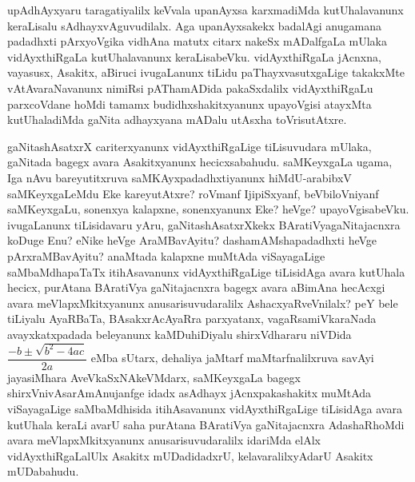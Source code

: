 upAdhAyxyaru taragatiyalilx keVvala upanAyxsa karxmadiMda kutUhalavanunx keraLi\-salu sAdhayxvAguvudilalx. Aga upanAyxsakekx badalAgi anugamana padadhxti pArxyoVgika vidhAna matutx citarx nakeSx mADalfgaLa mUlaka vidAyxthiRgaLa kutUhalavanunx keraLisabeVku. vidAyxthiRgaLa jAcnxna, vayasusx, Asakitx, aBiruci ivugaLanunx tiLidu paThayxvasutxgaLige takakxMte vAtAvaraNavanunx nimiRsi pAThamADida pakaSxdalilx vidAyxthiRgaLu parxcoVdane hoMdi tamamx budidhxshakitxyanunx upayoVgisi atayxMta kutUhaladiMda gaNita adhayxyana mADalu utAsxha toVrisutAtxre.

gaNitashAsatxrX cariterxyanunx vidAyxthiRgaLige tiLisuvudara mUlaka, gaNitada bagegx avara Asakitxyanunx hecicxsabahudu. saMKeyxgaLa ugama, Iga nAvu bareyutitxruva saMKAyx\-padadhxtiyanunx hiMdU-arabibxV saMKeyxgaLeMdu Eke kareyutAtxre? roVmanf IjipiSx\-yanf, beVbiloVniyanf saMKeyxgaLu, sonenxya kalapxne, sonenxyanunx Eke? heVge? upayoVgisabeVku. ivugaLanunx tiLisidavaru yAru, gaNitashAsatxrXkekx BAratiVya\break gaNitajacnxra koDuge Enu? eNike heVge AraMBavAyitu? dashamAMshapadadhxti heVge pArxraMBavAyitu? anaMtada kalapxne muMtAda viSayagaLige saMbaMdhapaTaTx itihAsa\-vanunx vidAyxthiR\-gaLige tiLisidAga avara kutUhala hecicx, purAtana BAratiVya \-gaNitajacnxra bagegx avara aBimAna hecAcxgi avara meVlapxMkitxyanunx anusarisuvudaralilx AshacxyaR\-veVnilalx? peY bele tiLiyalu AyaRBaTa, BAsakxrAcAyaRra parxyatanx, vagaRsamiVka\-raNada avayxkatxpadada beleyanunx kaMDuhiDiyalu shirxVdhararu niVDida $\dfrac{-b \pm \sqrt{b^2-4ac}}{2a}$ eMba sUtarx, dehaliya jaMtarf maMtarfnalilxruva savAyi jayasiMhara AveVkaSxNA\-keVMdarx, saMKeyxgaLa bagegx shirxVnivAsarAmAnujanfge idadx asAdhayx jAcnxpakashakitx muMtAda viSayagaLige saMbaMdhisida itihAsavanunx vidAyxthiRgaLige tiLisidAga avara kutUhala keraLi avarU saha purAtana BAratiVya gaNitajacnxra AdashaRhoMdi avara meVlapxMkitx\-yanunx anusarisuvudaralilx idariMda elAlx vidAyxthiRgaLalUlx Asakitx mUDadidadxrU, kelavaralilxyAdarU Asakitx mUDabahudu.

